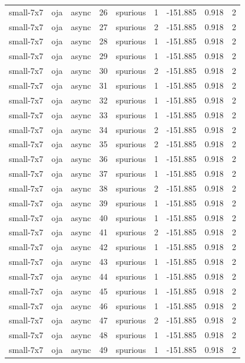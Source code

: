 \begin{tabular}{lllrlrrrr}
small-7x7 & oja & async & 26 & spurious & 1 & -151.885 & 0.918 & 2 \\
small-7x7 & oja & async & 27 & spurious & 2 & -151.885 & 0.918 & 2 \\
small-7x7 & oja & async & 28 & spurious & 1 & -151.885 & 0.918 & 2 \\
small-7x7 & oja & async & 29 & spurious & 1 & -151.885 & 0.918 & 2 \\
small-7x7 & oja & async & 30 & spurious & 2 & -151.885 & 0.918 & 2 \\
small-7x7 & oja & async & 31 & spurious & 1 & -151.885 & 0.918 & 2 \\
small-7x7 & oja & async & 32 & spurious & 1 & -151.885 & 0.918 & 2 \\
small-7x7 & oja & async & 33 & spurious & 1 & -151.885 & 0.918 & 2 \\
small-7x7 & oja & async & 34 & spurious & 2 & -151.885 & 0.918 & 2 \\
small-7x7 & oja & async & 35 & spurious & 2 & -151.885 & 0.918 & 2 \\
small-7x7 & oja & async & 36 & spurious & 1 & -151.885 & 0.918 & 2 \\
small-7x7 & oja & async & 37 & spurious & 1 & -151.885 & 0.918 & 2 \\
small-7x7 & oja & async & 38 & spurious & 2 & -151.885 & 0.918 & 2 \\
small-7x7 & oja & async & 39 & spurious & 1 & -151.885 & 0.918 & 2 \\
small-7x7 & oja & async & 40 & spurious & 1 & -151.885 & 0.918 & 2 \\
small-7x7 & oja & async & 41 & spurious & 2 & -151.885 & 0.918 & 2 \\
small-7x7 & oja & async & 42 & spurious & 1 & -151.885 & 0.918 & 2 \\
small-7x7 & oja & async & 43 & spurious & 1 & -151.885 & 0.918 & 2 \\
small-7x7 & oja & async & 44 & spurious & 1 & -151.885 & 0.918 & 2 \\
small-7x7 & oja & async & 45 & spurious & 1 & -151.885 & 0.918 & 2 \\
small-7x7 & oja & async & 46 & spurious & 1 & -151.885 & 0.918 & 2 \\
small-7x7 & oja & async & 47 & spurious & 2 & -151.885 & 0.918 & 2 \\
small-7x7 & oja & async & 48 & spurious & 1 & -151.885 & 0.918 & 2 \\
small-7x7 & oja & async & 49 & spurious & 1 & -151.885 & 0.918 & 2 \\

\end{tabular}
